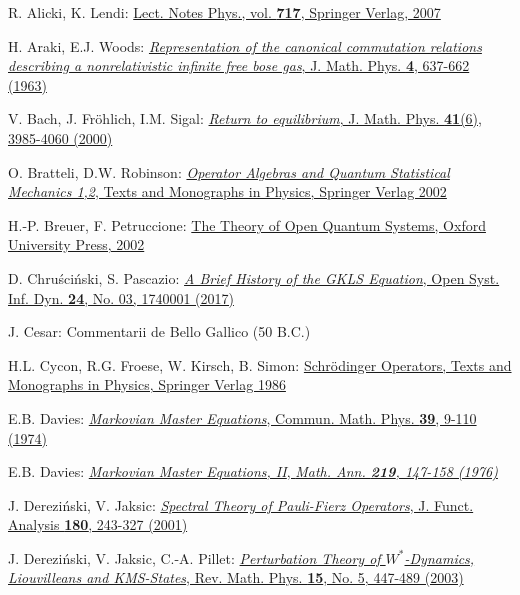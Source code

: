 \documentclass[letterpaper,onecolumn,11pt,accepted=2021-12-09]{quantumarticle}
\numberwithin{equation}{section}
\begin{document}
\begin{thebibliography}{}

R. Alicki, K. Lendi:  \href{https://doi.org/10.1007/3-540-70861-8}{Lect. Notes Phys., vol. {\bf 717}, Springer Verlag, 2007}
	
	
H. Araki, E.J. Woods: \href{http://dx.doi.org/10.1063/1.1704002}{ {\em Representation of the canonical commutation relations describing a nonrelativistic infinite free bose gas}, J. Math. Phys. {\bf 4}, 637-662 (1963)} 


V. Bach, J. Fr\"ohlich, I.M. Sigal:  \href{http://dx.doi.org/10.1063/1.533334}{{\em Return to equilibrium},  J. Math. Phys. {\bf 41}(6), 3985-4060 (2000)}

O. Bratteli, D.W. Robinson: \href{http://dx.doi.org/10.1007/978-3-662-02520-8} {{\em Operator Algebras and Quantum Statistical Mechanics 1,2}, Texts and Monographs in Physics, Springer Verlag 2002}


H.-P. Breuer, F. Petruccione: \href{http://dx.doi.org/10.1093/acprof:oso/9780199213900.001.0001}{The Theory of Open Quantum Systems, Oxford University Press, 2002}

D. Chru\'sci\'nski, S. Pascazio: \href{http://dx.doi.org/10.1142/S1230161217400017}{{\em A Brief History of the GKLS Equation}, Open Syst. Inf. Dyn. {\bf 24}, No. 03, 1740001 (2017)}

J. Cesar: Commentarii de Bello Gallico (50 B.C.)

H.L. Cycon, R.G. Froese, W. Kirsch, B. Simon: \href{http://dx.doi.org/10.1007/978-3-540-77522-5}{Schr\"odinger Operators, Texts and Monographs in Physics,
Springer Verlag 1986}

E.B. Davies:  \href{http://dx.doi.org/10.1007/BF01608389}{{\em Markovian Master Equations}, Commun. Math. Phys. {\bf 39}, 9-110 (1974)}


E.B. Davies:  \href{http://dx.doi.org/10.1007/BF01351898}{{\em Markovian Master Equations, II}, \em Math. Ann. {\bf 219}, 147-158 (1976)}



J. Derezi\'nski, V. Jaksic: \href{http://dx.doi.org/10.1006/jfan.2000.3681}{{\em Spectral Theory of Pauli-Fierz Operators}, J. Funct. Analysis {\bf 180}, 243-327 (2001)}

J. Derezi\'nski, V. Jaksic, C.-A. Pillet: \href{http://dx.doi.org/10.1142/S0129055X03001679}{{\em Perturbation Theory of $W^*$-Dynamics, Liouvilleans and KMS-States}, Rev. Math. Phys. {\bf 15}, No. 5, 447-489 (2003)}


\end{thebibliography}
\end{document}

